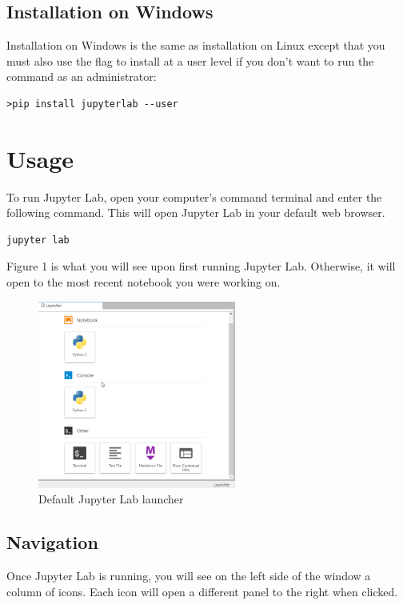 \documentclass[pdftex,12pt]{artikel3}
\begin{document}
\subsection{Installation on Windows}
Installation on Windows is the same as installation on Linux except that you must also use the flag to install at a user level if you don't want to run the command as an administrator:
\begin{lstlisting}
>pip install jupyterlab --user
\end{lstlisting}

\section{Usage}

To run Jupyter Lab, open your computer's command terminal and enter the following command. This will open Jupyter Lab in your default web browser.

\begin{lstlisting}
jupyter lab
\end{lstlisting}

Figure 1 is what you will see upon first running Jupyter Lab. Otherwise, it will open to the most recent notebook you were working on.

\begin{figure}[h!]
    \centering
    \includegraphics[width=65mm]{launcher.png}
    \caption{Default Jupyter Lab launcher}
    \label{fig:jupyterlablauncher}
\end{figure}

\subsection{Navigation}

Once Jupyter Lab is running, you will see on the left side of the window a column of icons. 
Each icon will open a different panel to the right when clicked. 
\end{document}
